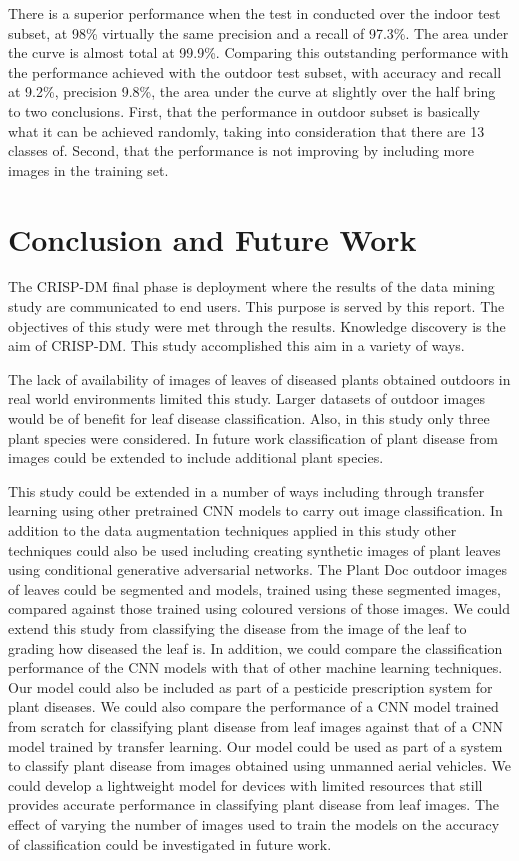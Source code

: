 \documentclass[conference]{IEEEtran}
\begin{document}
There is a superior performance when the test in conducted over the indoor test subset, at 98\% virtually the same precision and a recall of 97.3\%. The area under the curve is almost total at 99.9\%. Comparing this outstanding performance with the performance achieved with the outdoor test subset, with accuracy and recall at 9.2\%, precision 9.8\%, the area under the curve at slightly over the half bring to two conclusions. First, that the performance in outdoor subset is basically what it can be achieved randomly, taking into consideration that there are 13 classes of. Second, that the performance is not improving by including more images in the training set. 

\section{Conclusion and Future Work}
The CRISP-DM final phase is deployment where the results of the data mining study are communicated to end users. This purpose is served by this report. The objectives of this study were met through the results. Knowledge discovery is the aim of CRISP-DM. This study accomplished this aim in a variety of ways. 

The lack of availability of images of leaves of diseased plants obtained outdoors in real world environments limited this study. Larger datasets of outdoor images would be of benefit for leaf disease classification. Also, in this study only three plant species were considered. In future work classification of plant disease from images could be extended to include additional plant species.

This study could be extended in a number of ways including through transfer learning using other pretrained CNN models to carry out image classification. In addition to the data augmentation techniques applied in this study other techniques could also be used including creating synthetic images of plant leaves using conditional generative adversarial networks. The Plant Doc outdoor images of leaves could be segmented and models, trained using these segmented images, compared against those trained using coloured versions of those images. We could extend this study from classifying the disease from the image of the leaf to grading how diseased the leaf is. In addition, we could compare the classification performance of the CNN models with that of other machine learning techniques. Our model could also be included as part of a pesticide prescription system for plant diseases. We could also compare the performance of a CNN model trained from scratch for classifying plant disease from leaf images against that of a CNN model trained by transfer learning. Our model could be used as part of a system to classify plant disease from images obtained using unmanned aerial vehicles. We could develop a lightweight model for devices with limited resources that still provides accurate performance in classifying plant disease from leaf images. The effect of varying the number of images used to train the models on the accuracy of classification could be investigated in future work.         




\end{document}

